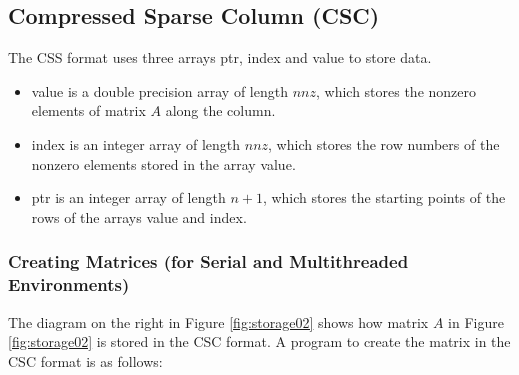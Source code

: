 \documentclass[a4paper]{article}
\begin{document}
\newpage
\subsection{Compressed Sparse Column (CSC)}
The CSS format uses three arrays {\ttfamily ptr}, {\ttfamily index} and
{\ttfamily value} to store data.
\begin{itemize}
\item {\ttfamily value} is a double precision array of length
      $nnz$, which stores the nonzero elements of matrix $A$ along the column.
\item {\ttfamily index} is an integer array of length $nnz$, which
      stores the row numbers of the nonzero elements stored in the
      array {\ttfamily value}.
\item {\ttfamily ptr} is an integer array of length $n+1$, which
      stores the starting points of the rows of the arrays {\ttfamily value} and {\ttfamily index}. 
\end{itemize}

\subsubsection{Creating Matrices (for Serial and Multithreaded Environments)}
The diagram on the right in Figure \ref{fig:storage02} shows how matrix $A$ in Figure \ref{fig:storage02} is stored in the CSC format. A program to create the matrix in the CSC format is as follows:
\end{document}
